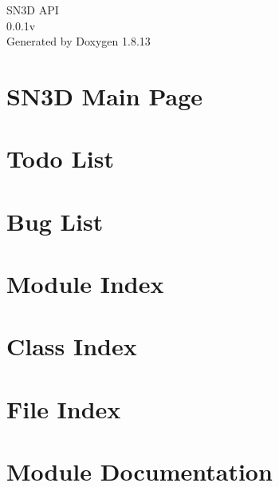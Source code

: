 \documentclass[twoside]{book}
\newcommand{\+}{\discretionary{\mbox{\scriptsize$\hookleftarrow$}}{}{}}
\newcommand{\clearemptydoublepage}{%
  \newpage{\pagestyle{empty}\cleardoublepage}%
}
\begin{document}
\hypersetup{pageanchor=false,
             bookmarksnumbered=true,
             pdfencoding=unicode
            }
\begin{titlepage}
\vspace*{7cm}
\begin{center}%
{\Large S\+N3D A\+PI \\[1ex]\large 0.\+0.\+1v }\\
\vspace*{1cm}
{\large Generated by Doxygen 1.8.13}\\
\end{center}
\end{titlepage}
\clearemptydoublepage
{}
\tableofcontents
\clearemptydoublepage
{}
\hypersetup{pageanchor=true}

\chapter{S\+N3D Main Page}
\label{index}\hypertarget{index}{}
\chapter{Todo List}
\label{todo}

\chapter{Bug List}
\label{bug}

\chapter{Module Index}

\chapter{Class Index}

\chapter{File Index}

\chapter{Module Documentation}





















\end{document}
